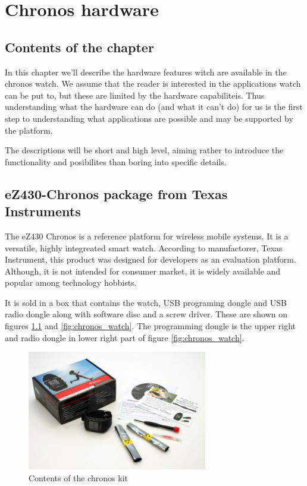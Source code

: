 \chapter{Chronos hardware}

\section{Contents of the chapter}

In this chapter we'll describe the hardware features witch are
available in the chronos watch. We assume that the reader is
interested in the applications watch can be put to, but these are
limited by the hardware capabiliteis. Thus understanding what the
hardware can do (and what it can't do) for us is the first step to
understanding what applications are possible and may be supported by
the platform.

The descriptions will be short and high level, aiming rather to
introduce the functionality and posibilites than boring into specific
details.

\section{eZ430-Chronos package from Texas Instruments}

The eZ430 Chronos is a reference platform for wireless mobile systems.
It is a versatile, highly integreated smart watch.  According to
manufactorer, Texas Instrument, this product was designed for
developers as an evaluation platform.  Although, it is not intended
for consumer market, it is widely available and popular among
technology hobbists.

It is sold in a box that contains the watch, USB programing dongle and
USB radio dongle along with software disc and a screw driver. These
are shown on figures \ref{fig:chronos_kit} and \ref{fig:chronos_watch}.
The programming dongle is the upper right and radio dongle in
lower right part of figure \ref{fig:chronos_watch}.

\begin{figure}[h]
  \centering
  \includegraphics[width=0.7\textwidth]{img/chronos_kit.jpg}
  \caption{Contents of the chronos kit}
  \label{fig:chronos_kit}
\end{figure}

